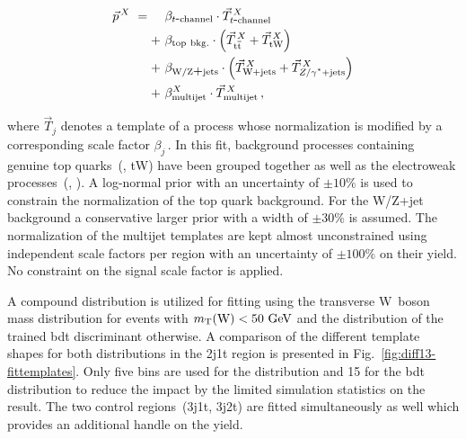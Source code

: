 \begin{subequations}
\begin{align}
\vec{p}^{\,X}~=\hphantom{+}&~\beta_{t\mathrm{\mbox{-}channel}}\cdot \vec{T}_{t\mathrm{\mbox{-}channel}}^{\,X}\\
+&~\beta_\mathrm{top~bkg.}\cdot\Big(\vec{T}^{\,X}_{\ttbar}+\vec{T}^{\,X}_\mathrm{tW}\Big)\\
+&~\beta_\mathrm{W/Z\mbox{+}jets}\cdot\Big(\vec{T}^{\,X}_{\wjets}+\vec{T}^{\,X}_{\zjets}\Big)\\
+&~\beta_\mathrm{multijet}^{X}\cdot \vec{T}^{\,X}_\mathrm{multijet}\,,
\end{align}
\end{subequations}

where $\vec{T}_{j}$ denotes a template of a process whose normalization is modified by a corresponding scale factor $\beta_{j}$\,. In this fit, background processes containing genuine top quarks~(\ttbar, tW) have been grouped together as well as the electroweak processes~(\wjets, \zjets). A log-normal prior with an uncertainty of $\pm10\%$ is used to constrain the normalization of the top quark background. For the W/Z+jet background a conservative larger prior with a width of $\pm30\%$ is assumed. The normalization of the multijet templates are kept almost unconstrained using independent scale factors per region with an uncertainty of $\pm100\%$ on their yield. No constraint on the signal scale factor is applied.

A compound distribution is utilized for fitting using the transverse W~boson mass distribution for events with $m_{\textrm{T}}(\textrm{W})<50~\textrm{GeV}$ and the distribution of the trained \gls{bdt} discriminant otherwise. A comparison of the different template shapes for both distributions in the 2j1t region is presented in Fig.~\ref{fig:diff13-fittemplates}. Only five bins are used for the \mtw distribution and 15 for the \gls{bdt} distribution to reduce the impact by the limited simulation statistics on the result. The two \ttbar control regions~(3j1t, 3j2t) are fitted simultaneously as well which provides an additional handle on the \ttbar yield. 


